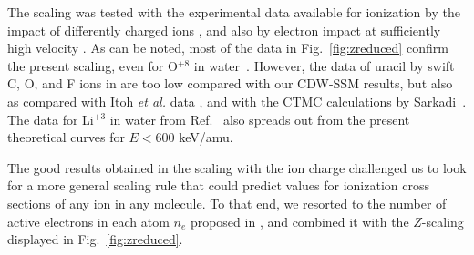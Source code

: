 \documentclass[10pt,showpacs,showkeys,twocolumn]{revtex4-1}
\begin{document}
The scaling was tested with the experimental data available for 
ionization by the impact of differently charged ions \cite{itoh2013,
iriki2011,wolff2014,wang2016,tribedi2019,agnihotri2012,agnihotri2013,
Luna2007,Rudd86,Rudd85,Luna_Li_water,DalCappello2009,Tribedi_O_water}, 
and also by electron impact at sufficiently high velocity 
\cite{rahman2016,bug2017,wolf2019,fuss2009}. As can be noted, most of 
the data in Fig.~\ref{fig:zreduced} confirm the present scaling, even 
for O$^{+8}$ in water~\cite{Tribedi_O_water}. However, the data of 
uracil by swift C, O, and F ions in \cite{agnihotri2012,agnihotri2013} 
are too low compared with our CDW-SSM results, but also as compared 
with Itoh \textit{et al.} data \cite{itoh2013}, and with the CTMC 
calculations by Sarkadi~\cite{sarkadi2016}. The data for Li$^{+3}$ in 
water from Ref.~\cite{Luna_Li_water} also spreads out from the present 
theoretical curves for $E<600$ keV/amu.

The good results obtained in the scaling with the ion charge challenged 
us to look for a more general scaling rule that could predict values 
for ionization cross sections of any ion in any molecule. To that end, 
we resorted to the number of active electrons in each atom $n_e$ 
proposed in \cite{MendezJPB20}, and combined it with the $Z$-scaling 
displayed in Fig.~\ref{fig:zreduced}.
\end{document}
